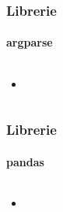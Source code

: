 \begin{contentframe}
    \frametitle{Librerie}
    \framesubtitle{argparse}

    \begin{columns}
        \begin{itemize}
            \item 
        \end{itemize}
        
        \centering
    \end{columns}
\end{contentframe}

\begin{contentframe}
    \frametitle{Librerie}
    \framesubtitle{pandas}

    \begin{columns}
        \begin{itemize}
            \item 
        \end{itemize}
        
        \centering
    \end{columns}
\end{contentframe}

